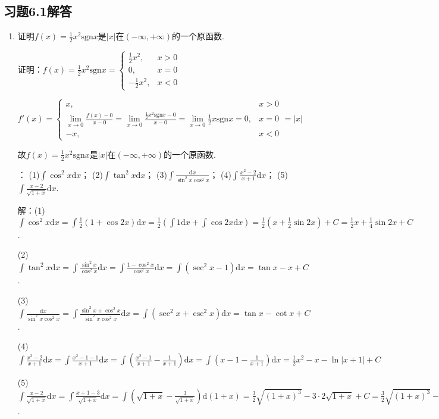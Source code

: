 \documentclass[12pt,UTF8]{ctexart}
\begin{document}
\subsection{习题6.1解答}
\begin{enumerate}
\item 证明$f(x)=\frac12x^2\text{sgn}x$是$|x|$在$(-\infty,+\infty)$的一个原函数.

证明：$f(x)=\frac12x^2\text{sgn}x=\begin{cases}
\frac12x^2,&x>0\\
0,&x=0\\
-\frac12x^2,&x<0
\end{cases}$

$f'(x)=\begin{cases}
x,&x>0\\
\lim\limits_{x\rightarrow0}\frac{f(x)-0}{x-0}=\lim\limits_{x\rightarrow0}\frac{\frac12x^2\text{sgn}x-0}{x-0}=\lim\limits_{x\rightarrow0}\frac12x\text{sgn}x=0,&x=0\\
-x,&x<0
\end{cases}=|x|$

故$f(x)=\frac12x^2\text{sgn}x$是$|x|$在$(-\infty,+\infty)$的一个原函数.

：
\newline
(1)$\int\cos^2x\mathrm dx$；
\newline
(2)$\int\tan^2x\mathrm dx$；
\newline
(3)$\int\frac{\mathrm dx}{\sin^2x\cos^2x}$；
\newline
(4)$\int\frac{x^2-2}{x+1}\mathrm dx$；
\newline
(5)$\int\frac{x-2}{\sqrt{1+x}}\mathrm dx$.

解：(1)$\int\cos^2x\mathrm dx=\int\frac12(1+\cos2x)\mathrm dx=\frac12(\int1\mathrm dx+\int\cos2x\mathrm dx)=\frac12(x+\frac12\sin2x)+C=\frac12x+\frac14\sin2x+C$.

(2)$\int\tan^2x\mathrm dx=\int\frac{\sin^2x}{\cos^2x}\mathrm dx=\int\frac{1-\cos^2x}{\cos^2x}\mathrm dx=\int(\sec^2x-1)\mathrm dx=\tan x-x+C$.

(3)$\int\frac{\mathrm dx}{\sin^2x\cos^2x}=\int\frac{\sin^2x+\cos^2x}{\sin^2x\cos^2x}\mathrm dx=\int(\sec^2x+\csc^2x)\mathrm dx=\tan x-\cot x+C$.

(4)$\int\frac{x^2-2}{x+1}\mathrm dx=\int\frac{x^2-1-1}{x+1}\mathrm dx=\int(\frac{x^2-1}{x+1}-\frac1{x+1})\mathrm dx=\int(x-1-\frac1{x+1})\mathrm dx=\frac12x^2-x-\ln|x+1|+C$

(5)$\int\frac{x-2}{\sqrt{1+x}}\mathrm dx=\int\frac{x+1-3}{\sqrt{1+x}}\mathrm dx=\int(\sqrt{1+x}-\frac3{\sqrt{1+x}})\mathrm d(1+x)=\frac32\sqrt{(1+x)^3}-3\cdot2\sqrt{1+x}+C=\frac32\sqrt{(1+x)^3}-6\sqrt{1+x}+C$.


\end{enumerate}
\end{document}
